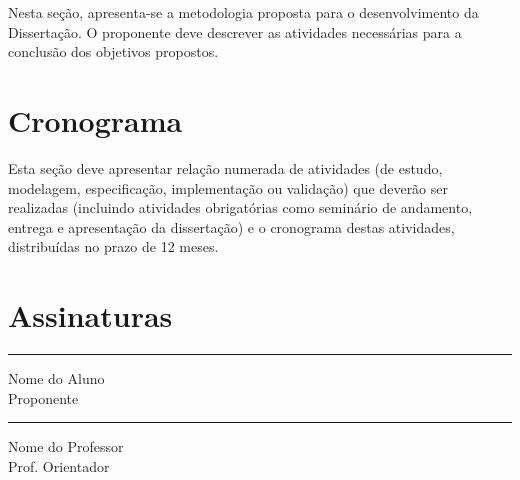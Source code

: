 \documentclass[diss-proposta,nocipinfo]{texufpel}
\begin{document}
Nesta seção, apresenta-se a metodologia proposta para o
desenvolvimento da Dissertação. O proponente deve descrever as
atividades necessárias para a conclusão dos objetivos propostos. 

\chapter{Cronograma}

Esta seção deve apresentar relação numerada de atividades (de estudo,
modelagem, especificação, implementação ou validação) que deverão ser
realizadas (incluindo atividades obrigatórias como seminário de
andamento, entrega e apresentação da dissertação) e o cronograma
destas atividades, distribuídas no prazo de 12
meses.




\chapter{Assinaturas}
\vspace{2cm}

\begin{center}
\rule{8cm}{.3mm}
\medskip

	Nome do Aluno\\
	Proponente

\end{center}

\vspace{4cm}

\begin{center}
\rule{8cm}{.3mm}
\medskip

	Nome do Professor\\
	Prof. Orientador

\end{center}
\end{document}
